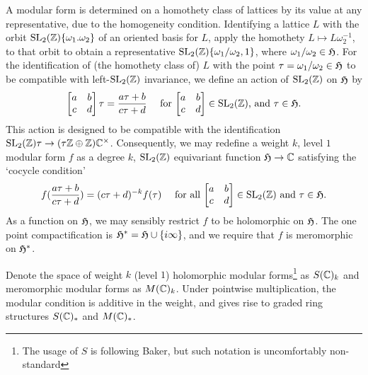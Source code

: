 \documentclass[11pt]{amsart}
\begin{document}
A modular form is determined on a homothety class of lattices by its value at any representative, due to the homogeneity condition. Identifying a lattice $L$ with the orbit $\operatorname{SL}_{2}(\mathbb{Z})\{\omega_{1}.\omega_{2}\}$ of an oriented basis for $L$, apply the homothety $L\mapsto L\omega_{2}^{-1}$, to that orbit to obtain a representative $\operatorname{SL}_{2}(\mathbb{Z})\{\omega_{1}/\omega_{2},1\}$, where $\omega_{1}/\omega_{2}\in \mathfrak{H}$. For the identification of (the homothety class of) $L$ with the point $\tau=\omega_{1}/\omega_{2} \in \mathfrak{H}$ to be compatible with left-$\operatorname{SL}_{2}(\mathbb{Z})$ invariance, we define an action of $\operatorname{SL}_{2}(\mathbb{Z})$ on $\mathfrak{H}$ by 
	\begin{align*}
		\left[ \begin{matrix} a & b \\ c & d \end{matrix} \right]\tau = \frac{a \tau +b}{c \tau+d} \quad \text{ for $\left[ \begin{matrix} a & b \\ c & d \end{matrix} \right]\in \operatorname{SL}_{2}(\mathbb{Z})$, and $\tau \in \mathfrak{H}$}.
	\end{align*}
This action is designed to be compatible with the identification $\operatorname{SL}_{2}(\mathbb{Z})\tau \to (\tau\mathbb{Z}\oplus \mathbb{Z})\mathbb{C}^{\times}$. Consequently, we may redefine a weight $k$, level $1$ modular form $f$ as a degree $k$, $\operatorname{SL}_{2}(\mathbb{Z})$ equivariant function $\mathfrak{H} \to \mathbb{C}$ satisfying the `cocycle condition'
	\begin{align*}
		f(\frac{a\tau+b}{c\tau+d})=(c\tau+d)^{-k}f(\tau) \quad \text{ for all $\left[ \begin{matrix} a & b \\ c & d \end{matrix} \right]\in \operatorname{SL}_{2}(\mathbb{Z})$ and $\tau \in \mathfrak{H}$.}
	\end{align*}
As a function on $\mathfrak{H}$, we may sensibly restrict $f$ to be holomorphic on $\mathfrak{H}$. The one point compactification is $\mathfrak{H}^{*}=\mathfrak{H} \cup \{ i \infty\}$, and we require that $f$ is meromorphic on $\mathfrak{H}^{*}$. 

Denote the space of weight $k$ (level $1$) holomorphic modular forms\footnote{The usage of $S$ is following Baker, but such notation is uncomfortably non-standard} as $S(\mathbb{C})_{k}$ and meromorphic modular forms as $M(\mathbb{C})_{k}$. Under pointwise multiplication, the modular condition is additive in the weight, and gives rise to graded ring structures $S(\mathbb{C})_{*}$ and $M(\mathbb{C})_{*}$.
 
\end{document}
